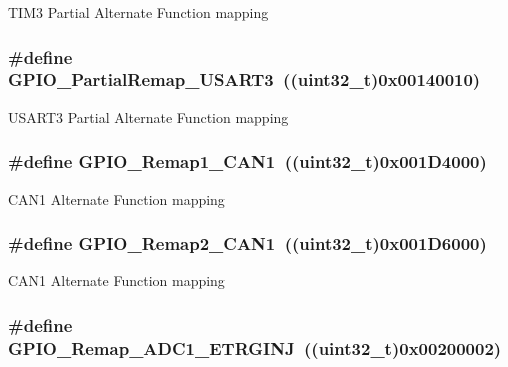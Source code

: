 \label{group__GPIO__Remap__define_gaaced3961a038fd8b41abfaf55d24f609}
TIM3 Partial Alternate Function mapping \hypertarget{group__GPIO__Remap__define_ga97af4aa8dded530353160cca615ad201}{
\subsubsection[{GPIO\_\-PartialRemap\_\-USART3}]{\setlength{\rightskip}{0pt plus 5cm}\#define GPIO\_\-PartialRemap\_\-USART3~((uint32\_\-t)0x00140010)}}
\label{group__GPIO__Remap__define_ga97af4aa8dded530353160cca615ad201}
USART3 Partial Alternate Function mapping \hypertarget{group__GPIO__Remap__define_ga89ac81224968d8faf42475be664c1e09}{
\subsubsection[{GPIO\_\-Remap1\_\-CAN1}]{\setlength{\rightskip}{0pt plus 5cm}\#define GPIO\_\-Remap1\_\-CAN1~((uint32\_\-t)0x001D4000)}}
\label{group__GPIO__Remap__define_ga89ac81224968d8faf42475be664c1e09}
CAN1 Alternate Function mapping \hypertarget{group__GPIO__Remap__define_gad4f5b46cf24bed1563b22e6ecca3ebef}{
\subsubsection[{GPIO\_\-Remap2\_\-CAN1}]{\setlength{\rightskip}{0pt plus 5cm}\#define GPIO\_\-Remap2\_\-CAN1~((uint32\_\-t)0x001D6000)}}
\label{group__GPIO__Remap__define_gad4f5b46cf24bed1563b22e6ecca3ebef}
CAN1 Alternate Function mapping \hypertarget{group__GPIO__Remap__define_gaf79d966f49b64d3feb0ba9cc39294dac}{
\subsubsection[{GPIO\_\-Remap\_\-ADC1\_\-ETRGINJ}]{\setlength{\rightskip}{0pt plus 5cm}\#define GPIO\_\-Remap\_\-ADC1\_\-ETRGINJ~((uint32\_\-t)0x00200002)}}
